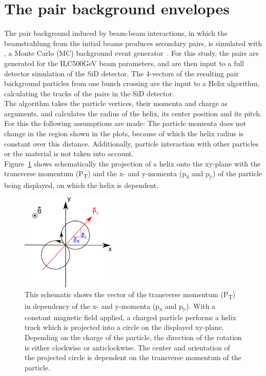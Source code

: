 \section{The pair background envelopes}
\label{Detector}
The pair background induced by beam-beam interactions, in which the beamstrahlung from the initial beams produces secondary \Pep \Pem pairs, is simulated with \guineapig, a Monte Carlo (MC) background event generator~\cite{Schulte:1997nga}.
For this study, the pairs are generated for the ILC500GeV beam parameters, and are then input to a \geant full detector simulation of the SiD detector.
The 4-vectors of the resulting pair background particles from one bunch crossing are the input to a Helix algorithm, calculating the tracks of the pairs in the SiD detector.\\
The algorithm takes the particle vertices, their momenta and charge as arguments, and calculates the radius of the helix, its center position and its pitch.
For this the following assumptions are made: 
The particle momenta does not change in the region shown in the plots, because of which the helix radius is constant over this distance.
Additionally, particle interaction with other particles or the material is not taken into account.\\
Figure~\ref{fig:helix_circle} shows schematically the projection of a helix onto the xy-plane with the transverse momentum (P\textsubscript{T}) and the x- and y-momenta (p\textsubscript{x} and p\textsubscript{y}) of the particle being displayed, on which the helix is dependent.

\begin{figure}
    \centering
    \includegraphics[width=0.4\textwidth]{figures/Helix_explanation.png}
    \caption[Projection of the helix on the xy-plane]{
    This schematic shows the vector of the transverse momentum (P\textsubscript{T}) in dependency of the x- and y-momenta (p\textsubscript{x} and p\textsubscript{y}).
    With a constant magnetic field applied, a charged particle performs a helix track which is projected into a circle on the displayed xy-plane.
    Depending on the charge of the particle, the direction of the rotation is either clockwise or anticlockwise.
    The center and orientation of the projected circle is dependent on the transverse momentum of the particle.
    }
    \label{fig:helix_circle}
\end{figure}

